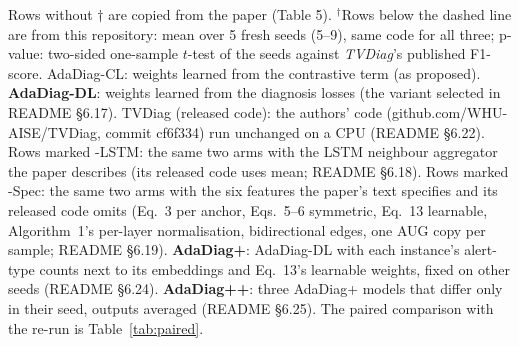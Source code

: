 \begin{table}[!ht]
\begin{minipage}{\linewidth}
 Rows without $\dagger$ are copied from the paper (Table 5). $^\dagger$Rows below the dashed line are from this repository: mean over 5 fresh seeds (5--9), same code for all three; p-value: two-sided one-sample $t$-test of the seeds against \textit{TVDiag}'s published F1-score. AdaDiag-CL: weights learned from the contrastive term (as proposed). \textbf{AdaDiag-DL}: weights learned from the diagnosis losses (the variant selected in README \S6.17). TVDiag (released code): the authors' code (github.com/WHU-AISE/TVDiag, commit cf6f334) run unchanged on a CPU (README \S6.22). Rows marked -LSTM: the same two arms with the LSTM neighbour aggregator the paper describes (its released code uses mean; README \S6.18). Rows marked -Spec: the same two arms with the six features the paper's text specifies and its released code omits (Eq.~3 per anchor, Eqs.~5--6 symmetric, Eq.~13 learnable, Algorithm~1's per-layer normalisation, bidirectional edges, one AUG copy per sample; README \S6.19). \textbf{AdaDiag+}: AdaDiag-DL with each instance's alert-type counts next to its embeddings and Eq.~13's learnable weights, fixed on other seeds (README \S6.24). \textbf{AdaDiag++}: three AdaDiag+ models that differ only in their seed, outputs averaged (README \S6.25). The paired comparison with the re-run is Table~\ref{tab:paired}.
\end{minipage}
\end{table}
